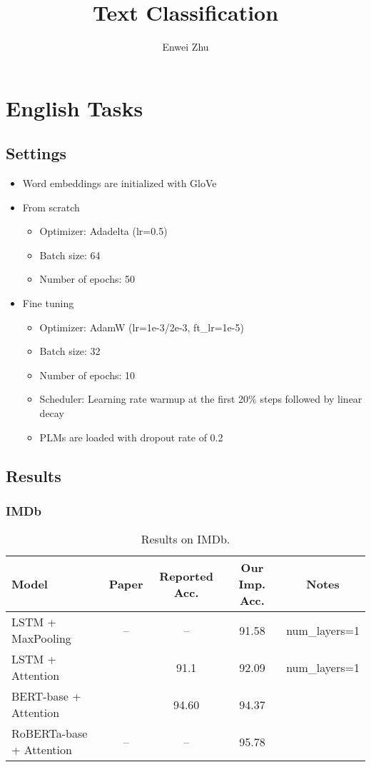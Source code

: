 \documentclass{article}
\title{Text Classification}
\author{Enwei Zhu}
\begin{document}
\maketitle

\section{English Tasks}
\subsection{Settings}
\begin{itemize}
    \item Word embeddings are initialized with GloVe
    \item From scratch
    \begin{itemize}
        \item Optimizer: Adadelta (lr=0.5)
        \item Batch size: 64
        \item Number of epochs: 50
    \end{itemize}
    \item Fine tuning 
    \begin{itemize}
        \item Optimizer: AdamW (lr=1e-3/2e-3, ft\_lr=1e-5)
        \item Batch size: 32
        \item Number of epochs: 10
        \item Scheduler: Learning rate warmup at the first 20\% steps followed by linear decay
        \item PLMs are loaded with dropout rate of 0.2
    \end{itemize}
\end{itemize}


\subsection{Results}
\subsubsection{IMDb}
\begin{table}[H]
    \centering
    \begin{tabular}{lcccc}
    \toprule
    Model & Paper & Reported Acc. & Our Imp. Acc. & Notes \\
    \midrule
    LSTM + MaxPooling        & --                        & --    & 91.58 & num\_layers=1 \\
    LSTM + Attention         & \citet{mccann2017learned} & 91.1  & 92.09 & num\_layers=1 \\
    BERT-base + Attention    & \citet{sun2019fine}       & 94.60 & 94.37 \\
    RoBERTa-base + Attention & --                        & --    & 95.78 \\
    \bottomrule
    \end{tabular}
    \caption{Results on IMDb.} 
\end{table}
\end{document}
